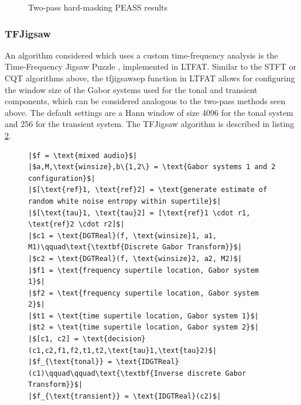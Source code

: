 \documentclass[letter,12pt]{article}
\newlength{\mintednumbersep}
\begin{document}
\begin{figure}[ht]
	\centering
	\caption{Two-pass hard-masking PEASS results}
	\label{fig:round2hard}
\end{figure}

\subsubsection{TFJigsaw}

An algorithm considered which uses a custom time-frequency analysis is the Time-Frequency Jigsaw Puzzle \cite{tfjigsaw}, implemented in LTFAT. Similar to the STFT or CQT algorithms above, the tfjigsawsep function in LTFAT allows for configuring the window size of the Gabor systems used for the tonal and transient components, which can be considered analogous to the two-pass methods seen above. The default settings are a Hann window of size 4096 for the tonal system and 256 for the transient system. The TFJigsaw algorithm is described in listing \ref{lst:tfjigsaw}.

\begin{figure}[h]
  \centering
  \centering
\begin{verbatim}
|$f = \text{mixed audio}$|
|$a,M,\text{winsize},b\{1,2\} = \text{Gabor systems 1 and 2 configuration}$|
|$[\text{ref}1, \text{ref}2] = \text{generate estimate of random white noise entropy within supertile}$|
|$[\text{tau}1, \text{tau}2] = [\text{ref}1 \cdot r1, \text{ref}2 \cdot r2]$|
|$c1 = \text{DGTReal}(f, \text{winsize}1, a1, M1)\qquad\text{\textbf{Discrete Gabor Transform}}$|
|$c2 = \text{DGTReal}(f, \text{winsize}2, a2, M2)$|
|$f1 = \text{frequency supertile location, Gabor system 1}$|
|$f2 = \text{frequency supertile location, Gabor system 2}$|
|$t1 = \text{time supertile location, Gabor system 1}$|
|$t2 = \text{time supertile location, Gabor system 2}$|
|$[c1, c2] = \text{decision}(c1,c2,f1,f2,t1,t2,\text{tau}1,\text{tau}2)$|
|$f_{\text{tonal}} = \text{IDGTReal}(c1)\qquad\qquad\text{\textbf{Inverse discrete Gabor Transform}}$|
|$f_{\text{transient}} = \text{IDGTReal}(c2)$|
\end{verbatim}
  \label{lst:tfjigsaw}
\end{figure}
\end{document}
